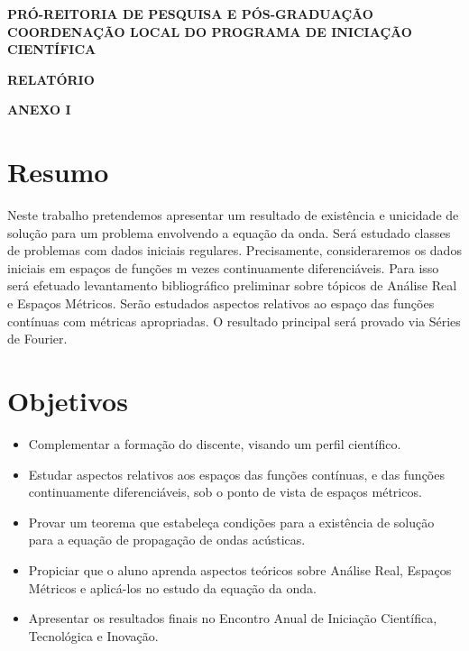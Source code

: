 \documentclass[a4paper,12pt]{article}
\begin{document}
\begin{flushleft}
    \textbf{\large PRÓ-REITORIA DE PESQUISA E PÓS-GRADUAÇÃO}
    \linebreak
    \linebreak
    \textbf{\large COORDENAÇÃO LOCAL DO PROGRAMA DE INICIAÇÃO CIENTÍFICA}
\end{flushleft}

\begin{center}
    \textbf{RELATÓRIO}

    \textbf{ANEXO I}
\end{center}

\section{Resumo}

Neste trabalho pretendemos apresentar um resultado de existência e unicidade de
solução para um problema envolvendo a equação da onda. Será estudado classes de
problemas com dados iniciais regulares. Precisamente, consideraremos os dados
iniciais em espaços de funções m vezes continuamente diferenciáveis. Para isso será
efetuado levantamento bibliográfico preliminar sobre tópicos de Análise Real e
Espaços Métricos. Serão estudados aspectos relativos ao espaço das funções
contínuas com métricas apropriadas. O resultado principal será provado via Séries de
Fourier.

\section{Objetivos}

\begin{itemize}
    \item Complementar a formação do discente, visando um perfil científico.

    \item Estudar aspectos relativos aos espaços das funções contínuas, e das funções
          continuamente diferenciáveis, sob o ponto de vista de espaços métricos.

    \item Provar um teorema que estabeleça condições para a existência de solução
          para a equação de propagação de ondas acústicas.

    \item Propiciar que o aluno aprenda aspectos teóricos sobre Análise Real, Espaços
          Métricos e aplicá-los no estudo da equação da onda.

    \item Apresentar os resultados finais no Encontro Anual de Iniciação Científica,
          Tecnológica e Inovação.
\end{itemize}
\end{document}
